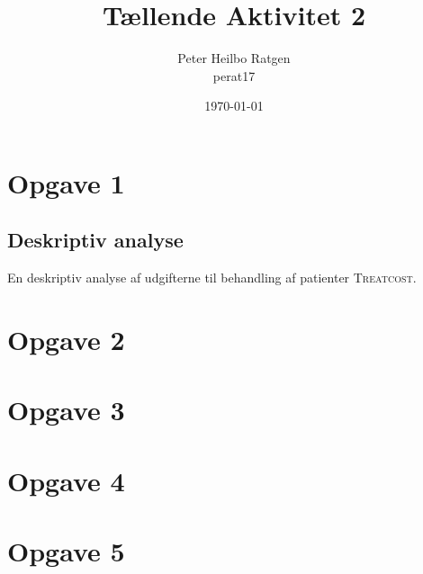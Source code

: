 \documentclass{article}
\title{Tællende Aktivitet 2}
\author{Peter Heilbo Ratgen \\ perat17}
\date{\today}
\begin{document}
\maketitle

\section{Opgave 1}
\subsection{Deskriptiv analyse}
En deskriptiv analyse af udgifterne til behandling af patienter
\textsc{Treatcost}.




\section*{Opgave 2}


\section*{Opgave 3}


\section*{Opgave 4}


\section*{Opgave 5}

\end{document}

